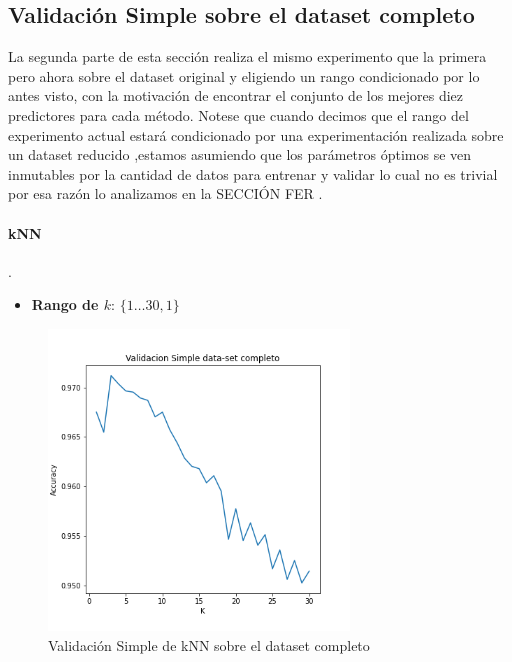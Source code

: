 \subsection{Validación Simple sobre el dataset completo}

La segunda parte de esta sección realiza el mismo experimento que la primera pero ahora sobre el dataset original y eligiendo un rango condicionado por lo antes visto, con la motivación de encontrar el conjunto de los mejores diez predictores para cada método. Notese que cuando decimos que el rango del experimento actual estará condicionado por una experimentación realizada sobre un dataset reducido ,estamos asumiendo que los parámetros óptimos se ven inmutables por la cantidad de datos para entrenar y validar lo cual no es trivial por esa razón lo analizamos en la SECCIÓN FER .


\paragraph{kNN}
.
\begin{itemize}

    \item \textbf{Rango de $k$}: $\{1\dots30, 1\}$


\end{itemize}

\begin{figure}[H]
    \centering
    \includegraphics[width=8cm]{images/validacionSimple_datasetCompleto.png}%
    \qquad
    \caption{Validación Simple de kNN sobre el dataset completo}
    \label{knn_valSimple}%
\end{figure}

